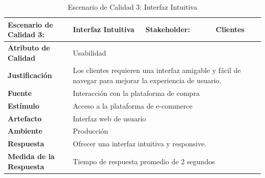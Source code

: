 \documentclass[12pt]{article}
\begin{document}
\begin{table}[H]
    \centering
    \begin{tabular}{|p{5cm}|p{3cm}|p{4cm}|p{4cm}|}
        \hline
        \multicolumn{1}{|p{5cm}|}{\cellcolor{teal!50}\textbf{Escenario de Calidad 3:}} & \multicolumn{1}{p{3cm}|}{Interfaz Intuitiva} & \multicolumn{1}{l|}{\cellcolor{teal!50}\textbf{Stakeholder:}} & \multicolumn{1}{l|}{Clientes} \\ \hline
        \multicolumn{1}{|p{5cm}|}{\cellcolor{teal!50}\textbf{Atributo de Calidad}}    & \multicolumn{3}{p{11cm}|}{Usabilidad} \\ \hline
        \multicolumn{1}{|p{5cm}|}{\cellcolor{teal!50}\textbf{Justificación}}           & \multicolumn{3}{p{11cm}|}{Los clientes requieren una interfaz amigable y fácil de navegar para mejorar la experiencia de usuario.} \\ \hline
        \multicolumn{1}{|p{5cm}|}{\cellcolor{teal!50}\textbf{Fuente}}                  & \multicolumn{3}{p{11cm}|}{Interacción con la plataforma de compra} \\ \hline
        \multicolumn{1}{|p{5cm}|}{\cellcolor{teal!50}\textbf{Estímulo}}                & \multicolumn{3}{p{11cm}|}{Acceso a la plataforma de e-commerce} \\ \hline
        \multicolumn{1}{|p{5cm}|}{\cellcolor{teal!50}\textbf{Artefacto}}               & \multicolumn{3}{p{11cm}|}{Interfaz web de usuario} \\ \hline
        \multicolumn{1}{|p{5cm}|}{\cellcolor{teal!50}\textbf{Ambiente}}                & \multicolumn{3}{p{11cm}|}{Producción} \\ \hline
        \multicolumn{1}{|p{5cm}|}{\cellcolor{teal!50}\textbf{Respuesta}}               & \multicolumn{3}{p{11cm}|}{Ofrecer una interfaz intuitiva y responsive.} \\ \hline
        \multicolumn{1}{|p{5cm}|}{\cellcolor{teal!50}\textbf{Medida de la Respuesta}}  & \multicolumn{3}{p{11cm}|}{Tiempo de respuesta promedio de 2 segundos} \\ \hline
    \end{tabular}
    \caption{Escenario de Calidad 3: Interfaz Intuitiva}
    \label{tab:escenarios_calidad_3}
\end{table}
\end{document}
